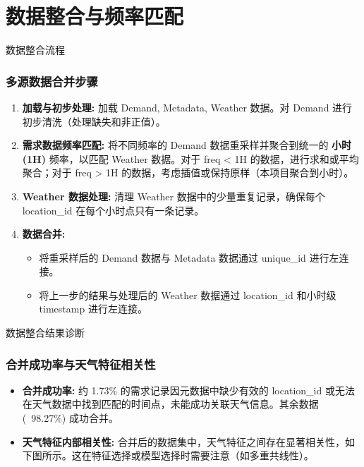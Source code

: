 \documentclass{beamer} %
\begin{document}
\section{数据整合与频率匹配}

\begin{frame}{数据整合流程}
    \frametitle{多源数据合并步骤}
    \begin{enumerate}
        \item \textbf{加载与初步处理:} 加载 Demand, Metadata, Weather 数据。对 Demand 进行初步清洗（处理缺失和非正值）。
        \item \textbf{需求数据频率匹配:} 将不同频率的 Demand 数据重采样并聚合到统一的 \textbf{小时 (1H)} 频率，以匹配 Weather 数据。对于 freq < 1H 的数据，进行求和或平均聚合；对于 freq > 1H 的数据，考虑插值或保持原样（本项目聚合到小时）。
        \item \textbf{Weather 数据处理:} 清理 Weather 数据中的少量重复记录，确保每个 location\_id 在每个小时点只有一条记录。
        \item \textbf{数据合并:}
        \begin{itemize}
            \item 将重采样后的 Demand 数据与 Metadata 数据通过 unique\_id 进行左连接。
            \item 将上一步的结果与处理后的 Weather 数据通过 location\_id 和小时级 timestamp 进行左连接。
        \end{itemize}
    \end{enumerate}
\end{frame}

\begin{frame}{数据整合结果诊断}
    \frametitle{合并成功率与天气特征相关性}
    \begin{itemize}
        \item \textbf{合并成功率:} 约 1.73\% 的需求记录因元数据中缺少有效的 location\_id 或无法在天气数据中找到匹配的时间点，未能成功关联天气信息。其余数据 (~98.27\%) 成功合并。
        \item \textbf{天气特征内部相关性:} 合并后的数据集中，天气特征之间存在显著相关性，如下图所示。这在特征选择或模型选择时需要注意（如多重共线性）。
    \end{itemize}
\end{frame}
\end{document}
